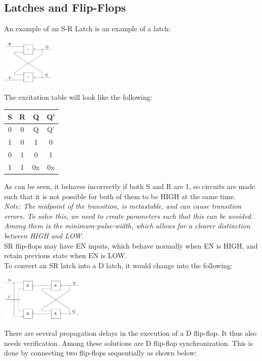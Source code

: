 \documentclass[nobib]{tufte-handout}
\begin{document}
    \subsection{Latches and Flip-Flops}
    An example of an S-R Latch is an example of a latch:
    \begin{center}
        \includegraphics[width= 100px]{images/srlatch.png}
    \end{center}
    The excitation table will look like the following:
    \begin{table}
        \centering
        \begin{tabular}{c c|c c}
            S & R & Q  & Q' \\
            \hline
            0 & 0 & Q  & Q' \\
            1 & 0 & 1  & 0  \\
            0 & 1 & 0  & 1  \\
            1 & 1 & 0x & 0x
        \end{tabular}
    \end{table}
    As can be seen, it behaves incorrectly if both S and R are 1, so circuits are made such that it is not possible for both of them to be HIGH at the same time.\\
    \textit{Note: The midpoint of the transition, is metastable, and can cause transition errors. To solve this, we need to create parameters such that this can be avoided. Among them is the minimum-pulse-width, which allows for a clearer distinction between HIGH and LOW.\\}
    SR flip-flops may have EN inputs, which behave normally when EN is HIGH, and retain previous state when EN is LOW.\\
    To convert an SR latch into a D latch, it would change into the following:
    \begin{center}
        \includegraphics[width = 150px]{images/dlatch.png}
    \end{center}
    There are several propagation delays in the execution of a D flip-flop. It thus also needs verification. Among these solutions are D flip-flop synchronization. This is done by connecting two flip-flops sequentially as shown below:
\end{document}
